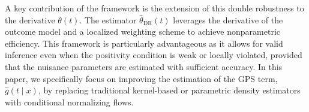 \documentclass[12pt]{article}
\newcommand{\ind}{\perp\!\!\!\perp}
\theoremstyle{definition}
\newtheorem{assumption}{Assumption}
\begin{document}
A key contribution of the \citet{Zhang2025a} framework is the extension of this double robustness to the derivative $\theta(t)$. The estimator $\widehat{\theta}_{\text{DR}}(t)$ leverages the derivative of the outcome model and a localized weighting scheme to achieve nonparametric efficiency. This framework is particularly advantageous as it allows for valid inference even when the positivity condition is weak or locally violated, provided that the nuisance parameters are estimated with sufficient accuracy. In this paper, we specifically focus on improving the estimation of the GPS term, $\widehat{g}(t \mid x)$, by replacing traditional kernel-based or parametric density estimators with conditional normalizing flows.


%
\end{document}
